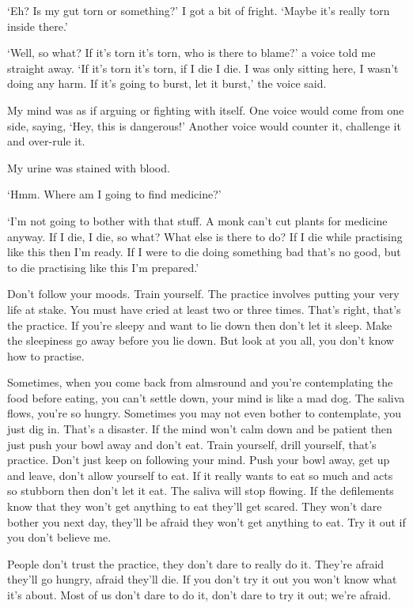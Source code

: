 `Eh? Is my gut torn or something?' I got a bit of fright. `Maybe it's really torn inside there.' 

`Well, so what? If it's torn it's torn, who is there to blame?' a voice told me straight away. `If it's torn it's torn, if I die I die. I was only sitting here, I wasn't doing any harm. If it's going to burst, let it burst,' the voice said. 

My mind was as if arguing or fighting with itself. One voice would come from one side, saying, `Hey, this is dangerous!' Another voice would counter it, challenge it and over-rule it. 

My urine was stained with blood. 

`Hmm. Where am I going to find medicine?' 

`I'm not going to bother with that stuff. A monk can't cut plants for medicine anyway. If I die, I die, so what? What else is there to do? If I die while practising like this then I'm ready. If I were to die doing something bad that's no good, but to die practising like this I'm prepared.' 

Don't follow your moods. Train yourself. The practice involves putting your very life at stake. You must have cried at least two or three times. That's right, that's the practice. If you're sleepy and want to lie down then don't let it sleep. Make the sleepiness go away before you lie down. But look at you all, you don't know how to practise. 

Sometimes, when you come back from almsround and you're contemplating the food before eating, you can't settle down, your mind is like a mad dog. The saliva flows, you're so hungry. Sometimes you may not even bother to contemplate, you just dig in. That's a disaster. If the mind won't calm down and be patient then just push your bowl away and don't eat. Train yourself, drill yourself, that's practice. Don't just keep on following your mind. Push your bowl away, get up and leave, don't allow yourself to eat. If it really wants to eat so much and acts so stubborn then don't let it eat. The saliva will stop flowing. If the defilements know that they won't get anything to eat they'll get scared. They won't dare bother you next day, they'll be afraid they won't get anything to eat. Try it out if you don't believe me. 

People don't trust the practice, they don't dare to really do it. They're afraid they'll go hungry, afraid they'll die. If you don't try it out you won't know what it's about. Most of us don't dare to do it, don't dare to try it out; we're afraid. 

